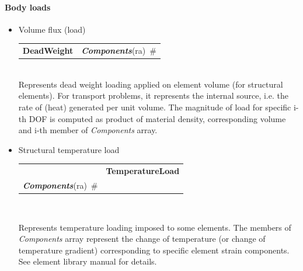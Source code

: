 \documentclass[a4paper]{article}
\makeatletter
\newcommand{\param}[1]{{\em #1}}
\newcommand{\keywordnotype}[1]{\mbox{{\it{\bf{#1}}}}}
\newcommand{\keyword}[2]{\mbox{{\keywordnotype{#1}\tiny (#2)}}}
\newcommand{\entKeywordInst}[1]{\mbox{{\bf{{#1}}}}}
\newcommand{\field}[2]{\mbox{\keyword{#1}{#2}~\#}}
\newenvironment{record}[1][]{\begin{tabular}{|ll}}{\end{tabular}\\}
\newcommand{\recentry}[2]{{#1}&{#2}\\}
\newcounter{rcc}
\newenvironment{record}[1][\textwidth]{\setcounter{rcc}{0}\begin{tabular*}{#1}{|ll@{\extracolsep{\fill}}r}}{\end{tabular*}\\}
\newcommand{\recentry}[2]{\ifthenelse{\value{rcc}>0}{&$\backslash$ \\}{\setcounter{rcc}{1}}{#1}&{#2}}
\makeatother
\begin{document}
\paragraph{Body loads}
\begin{itemize}
\item Volume flux (load) 

\noindent
\begin{record}[0.9\textwidth]
  \recentry{\entKeywordInst{DeadWeight}}{\field{Components}{ra}}
\end{record}
Represents dead weight loading applied on element volume (for
structural elements). For transport problems, it represents the
internal source, i.e. the rate of (heat) generated per unit volume. 
The magnitude of load for specific i-th DOF is computed as product of material density,
corresponding volume and i-th member of \param{Components} array.
\item Structural temperature load 

\noindent
\begin{record}[0.9\textwidth]
  \recentry{}{\entKeywordInst{TemperatureLoad}}{\field{Components}{ra}}
\end{record}

Represents temperature loading imposed to some elements. The members of
\param{Components} array represent the change of temperature (or change
of temperature gradient) corresponding to
specific element strain components. See element library manual for details.
\end{itemize}
\end{document}
